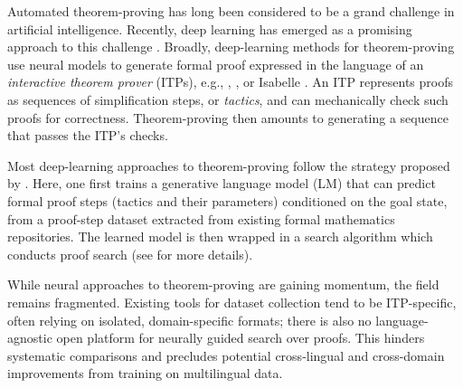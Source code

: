 Automated theorem-proving has long been considered to be a grand challenge in artificial intelligence. Recently, deep learning has emerged as a promising approach to this challenge \citep{li2024surveydeeplearningtheorem,yang2024formalmathematicalreasoningnew}. Broadly, deep-learning methods for theorem-proving use neural models to generate formal proof expressed in the language of an \emph{interactive theorem prover} (ITPs), e.g., \lean\; \citep{de2015lean}, \coq\; \citep{huet1997coq}, or Isabelle \citep{paulson1994isabelle}. An ITP represents proofs as sequences of simplification steps, or \emph{tactics}, and can mechanically check such proofs for correctness. Theorem-proving then amounts to generating a sequence that passes the ITP's checks.

Most deep-learning approaches to theorem-proving follow the strategy proposed by \citet{polu2020generative}. Here, one first trains a {generative language model} (LM) that can predict formal proof steps (tactics and their parameters) conditioned on the goal state, from a proof-step dataset extracted from existing formal mathematics repositories. The learned model is then wrapped in a search algorithm which conducts proof search (see  for more details). 

While neural approaches to theorem-proving are gaining momentum, the field remains fragmented.
Existing tools for dataset collection tend to be ITP-specific, often relying on isolated, domain-specific formats; there is also no language-agnostic open platform for neurally guided search over proofs. 
This hinders systematic comparisons and precludes potential cross-lingual and cross-domain improvements from training on multilingual data. 

